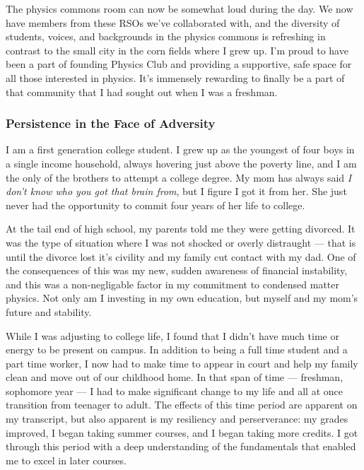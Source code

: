 \documentclass[11pt]{article}
\begin{document}
The physics commons room can now be somewhat loud during the day. We now have members from these RSOs we've collaborated with, and the diversity of students, voices, and backgrounds in the physics commons is refreshing in contrast to the small city in the corn fields where I grew up. I'm proud to have been a part of founding Physics Club and providing a supportive, safe space for all those interested in physics. It's immensely rewarding to finally be a part of that community that I had sought out when I was a freshman.
\subsubsection*{Persistence in the Face of Adversity}
I am a first generation college student. I grew up as the youngest of four boys in a single income household, always hovering just above the poverty line, and I am the only of the brothers to attempt a college degree. My mom has always said \textit{I don't know who you got that brain from}, but I figure I got it from her. She just never had the opportunity to commit four years of her life to college.

At the tail end of high school, my parents told me they were getting divorced. It was the type of situation where I was not shocked or overly distraught --- that is until the divorce lost it's civility and my family cut contact with my dad. One of the consequences of this was my new, sudden awareness of financial instability, and this was a non-negligable factor in my commitment to condensed matter physics. Not only am I investing in my own education, but myself and my mom's future and stability.

While I was adjusting to college life, I found that I didn't have much time or energy to be present on campus. In addition to being a full time student and a part time worker, I now had to make time to appear in court and help my family clean and move out of our childhood home. In that span of time --- freshman, sophomore year --- I had to make significant change to my life and all at once transition from teenager to adult. The effects of this time period are apparent on my transcript, but also apparent is my resiliency and perserverance: my grades improved, I began taking summer courses, and I began taking more credits. I got through this period with a deep understanding of the fundamentals that enabled me to excel in later courses.
\end{document}
